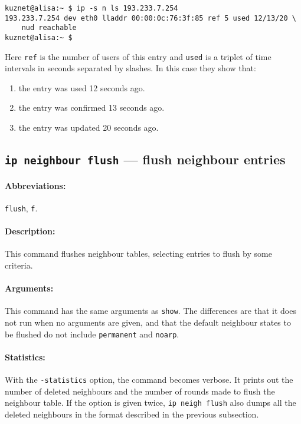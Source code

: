 \begin{verbatim}
kuznet@alisa:~ $ ip -s n ls 193.233.7.254
193.233.7.254 dev eth0 lladdr 00:00:0c:76:3f:85 ref 5 used 12/13/20 \
    nud reachable
kuznet@alisa:~ $ 
\end{verbatim}

Here \verb|ref| is the number of users of this entry
and \verb|used| is a triplet of time intervals in seconds
separated by slashes. In this case they show that:

\begin{enumerate}
\item the entry was used 12 seconds ago.
\item the entry was confirmed 13 seconds ago.
\item the entry was updated 20 seconds ago.
\end{enumerate}

\subsection{{\tt ip neighbour flush} --- flush neighbour entries}

\paragraph{Abbreviations:} \verb|flush|, \verb|f|.

\paragraph{Description:}This command flushes neighbour tables, selecting
entries to flush by some criteria.

\paragraph{Arguments:} This command has the same arguments as \verb|show|.
The differences are that it does not run when no arguments are given,
and that the default neighbour states to be flushed do not include
\verb|permanent| and \verb|noarp|.


\paragraph{Statistics:} With the \verb|-statistics| option, the command
becomes verbose. It prints out the number of deleted neighbours and the number
of rounds made to flush the neighbour table. If the option is given
twice, \verb|ip neigh flush| also dumps all the deleted neighbours
in the format described in the previous subsection.

